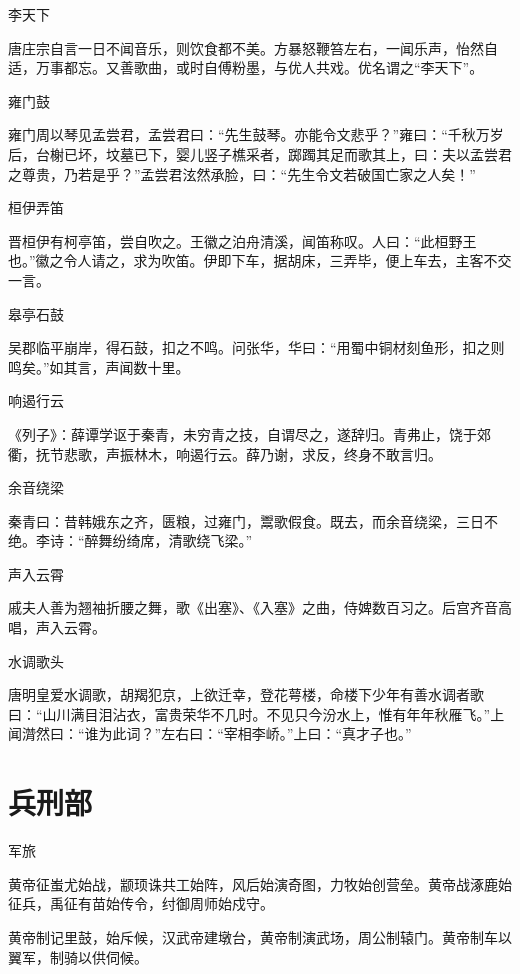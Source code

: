 \documentclass[a4paper,12pt,UTF8,twoside]{ctexbook}
\begin{document}
    李天下
    
    唐庄宗自言一日不闻音乐，则饮食都不美。方暴怒鞭笞左右，一闻乐声，怡然自适，万事都忘。又善歌曲，或时自傅粉墨，与优人共戏。优名谓之“李天下”。
    
    雍门鼓
    
    雍门周以琴见孟尝君，孟尝君曰：“先生鼓琴。亦能令文悲乎？”雍曰：“千秋万岁后，台榭已坏，坟墓已下，婴儿竖子樵采者，踯躅其足而歌其上，曰：夫以孟尝君之尊贵，乃若是乎？”孟尝君泫然承脸，曰：“先生令文若破国亡家之人矣！”
    
    桓伊弄笛
    
    晋桓伊有柯亭笛，尝自吹之。王徽之泊舟清溪，闻笛称叹。人曰：“此桓野王也。”徽之令人请之，求为吹笛。伊即下车，据胡床，三弄毕，便上车去，主客不交一言。
    
    皋亭石鼓
    
    吴郡临平崩岸，得石鼓，扣之不鸣。问张华，华曰：“用蜀中铜材刻鱼形，扣之则鸣矣。”如其言，声闻数十里。
    
    响遏行云
    
    《列子》：薛谭学讴于秦青，未穷青之技，自谓尽之，遂辞归。青弗止，饶于郊衢，抚节悲歌，声振林木，响遏行云。薛乃谢，求反，终身不敢言归。
    
    余音绕梁
    
    秦青曰：昔韩娥东之齐，匮粮，过雍门，鬻歌假食。既去，而余音绕梁，三日不绝。李诗：“醉舞纷绮席，清歌绕飞梁。”
    
    声入云霄
    
    戚夫人善为翘袖折腰之舞，歌《出塞》、《入塞》之曲，侍婢数百习之。后宫齐音高唱，声入云霄。
    
    水调歌头
    
    唐明皇爱水调歌，胡羯犯京，上欲迁幸，登花萼楼，命楼下少年有善水调者歌曰：“山川满目泪沾衣，富贵荣华不几时。不见只今汾水上，惟有年年秋雁飞。”上闻潸然曰：“谁为此词？”左右曰：“宰相李峤。”上曰：“真才子也。”
    
    
    
    \part{兵刑部}
    
    军旅
    
    黄帝征蚩尤始战，颛顼诛共工始阵，风后始演奇图，力牧始创营垒。黄帝战涿鹿始征兵，禹征有苗始传令，纣御周师始戍守。
    
    黄帝制记里鼓，始斥候，汉武帝建墩台，黄帝制演武场，周公制辕门。黄帝制车以翼军，制骑以供伺候。
    
\end{document}
